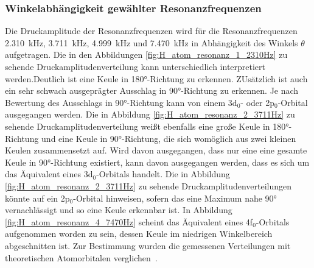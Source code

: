         \subsubsection*{Winkelabhängigkeit gewählter Resonanzfrequenzen}
            Die Druckamplitude der Resonanzfrequenzen wird für die Resonanzfrequenzen \SI{2.310}{\kilo\hertz}, \SI{3.711}{\kilo\hertz}, \SI{4.999}{\kilo\hertz} und \SI{7.470}{\kilo\hertz} in Abhängigkeit des 
            Winkels $\theta$ aufgetragen. Die in den Abbildungen \ref{fig:H_atom_resonanz_1_2310Hz} zu sehende Druckamplitudenverteilung kann unterschiedlich interpretiert werden.Deutlich ist eine Keule in 
            180°-Richtung zu erkennen. ZUsätzlich ist auch ein sehr schwach ausgeprägter Ausschlag in 90°-Richtung zu erkennen. Je nach Bewertung des Ausschlags in 90°-Richtung kann von einem 3d$_0$- oder 
            2p$_0$-Orbital ausgegangen werden. Die in Abbildung \ref{fig:H_atom_resonanz_2_3711Hz} zu sehende Druckamplitudenverteilung weißt ebenfalls eine große Keule in 180°-Richtung und eine Keule in 
            90°-Richtung, die sich womöglich aus zwei kleinen Keulen zusammensetzt auf. Wird davon ausgegangen, dass nur eine eine gesamte Keule in 90°-Richtung existiert, kann davon ausgegangen werden, dass es 
            sich um das Äquivalent eines 3d$_0$-Orbitals handelt. Die in Abbildung \ref{fig:H_atom_resonanz_2_3711Hz} zu sehende Druckamplitudenverteilungen könnte auf ein 2p$_0$-Orbital hinweisen, sofern das 
            eine Maximum nahe 90° vernachlässigt und so eine Keule erkennbar ist. In Abbildung \ref{fig:H_atom_resonanz_4_7470Hz} scheint das Äquivalent eines 4f$_0$-Orbitals aufgenommen worden zu sein, dessen 
            Keule im niedrigen Winkelbereich abgeschnitten ist. Zur Bestimmung wurden die gemessenen Verteilungen mit theoretischen Atomorbitalen verglichen~\cite{geek3_atomic_2018}.
            \FloatBarrier
